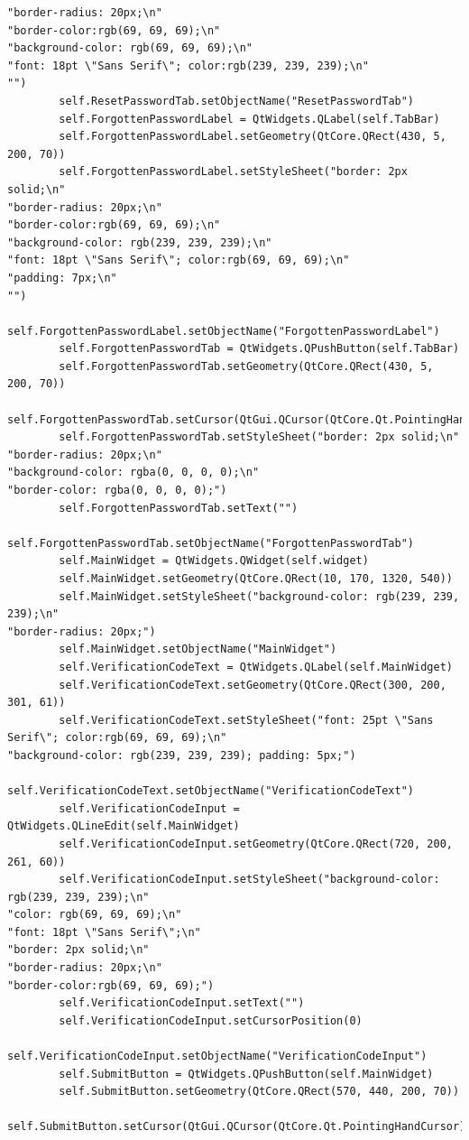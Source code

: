 \documentclass[12pt]{article}
\begin{document}
\begin{lstlisting}
"border-radius: 20px;\n"
"border-color:rgb(69, 69, 69);\n"
"background-color: rgb(69, 69, 69);\n"
"font: 18pt \"Sans Serif\"; color:rgb(239, 239, 239);\n"
"")
        self.ResetPasswordTab.setObjectName("ResetPasswordTab")
        self.ForgottenPasswordLabel = QtWidgets.QLabel(self.TabBar)
        self.ForgottenPasswordLabel.setGeometry(QtCore.QRect(430, 5, 200, 70))
        self.ForgottenPasswordLabel.setStyleSheet("border: 2px solid;\n"
"border-radius: 20px;\n"
"border-color:rgb(69, 69, 69);\n"
"background-color: rgb(239, 239, 239);\n"
"font: 18pt \"Sans Serif\"; color:rgb(69, 69, 69);\n"
"padding: 7px;\n"
"")
        self.ForgottenPasswordLabel.setObjectName("ForgottenPasswordLabel")
        self.ForgottenPasswordTab = QtWidgets.QPushButton(self.TabBar)
        self.ForgottenPasswordTab.setGeometry(QtCore.QRect(430, 5, 200, 70))
        self.ForgottenPasswordTab.setCursor(QtGui.QCursor(QtCore.Qt.PointingHandCursor))
        self.ForgottenPasswordTab.setStyleSheet("border: 2px solid;\n"
"border-radius: 20px;\n"
"background-color: rgba(0, 0, 0, 0);\n"
"border-color: rgba(0, 0, 0, 0);")
        self.ForgottenPasswordTab.setText("")
        self.ForgottenPasswordTab.setObjectName("ForgottenPasswordTab")
        self.MainWidget = QtWidgets.QWidget(self.widget)
        self.MainWidget.setGeometry(QtCore.QRect(10, 170, 1320, 540))
        self.MainWidget.setStyleSheet("background-color: rgb(239, 239, 239);\n"
"border-radius: 20px;")
        self.MainWidget.setObjectName("MainWidget")
        self.VerificationCodeText = QtWidgets.QLabel(self.MainWidget)
        self.VerificationCodeText.setGeometry(QtCore.QRect(300, 200, 301, 61))
        self.VerificationCodeText.setStyleSheet("font: 25pt \"Sans Serif\"; color:rgb(69, 69, 69);\n"
"background-color: rgb(239, 239, 239); padding: 5px;")
        self.VerificationCodeText.setObjectName("VerificationCodeText")
        self.VerificationCodeInput = QtWidgets.QLineEdit(self.MainWidget)
        self.VerificationCodeInput.setGeometry(QtCore.QRect(720, 200, 261, 60))
        self.VerificationCodeInput.setStyleSheet("background-color: rgb(239, 239, 239);\n"
"color: rgb(69, 69, 69);\n"
"font: 18pt \"Sans Serif\";\n"
"border: 2px solid;\n"
"border-radius: 20px;\n"
"border-color:rgb(69, 69, 69);")
        self.VerificationCodeInput.setText("")
        self.VerificationCodeInput.setCursorPosition(0)
        self.VerificationCodeInput.setObjectName("VerificationCodeInput")
        self.SubmitButton = QtWidgets.QPushButton(self.MainWidget)
        self.SubmitButton.setGeometry(QtCore.QRect(570, 440, 200, 70))
        self.SubmitButton.setCursor(QtGui.QCursor(QtCore.Qt.PointingHandCursor))

\end{lstlisting}
\end{document}

